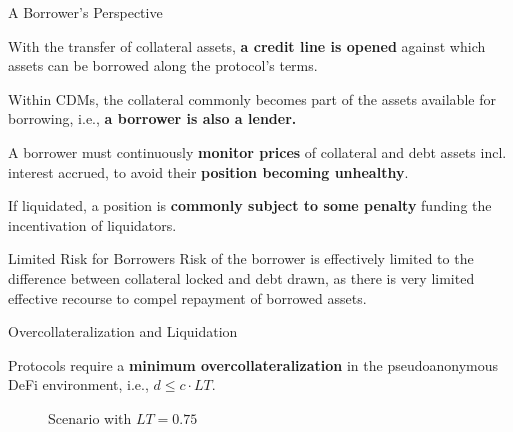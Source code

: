\documentclass[]{beamer}
\begin{document}
\begin{frame}{A Borrower's Perspective}

With the transfer of collateral assets, \textbf{a credit line is opened }against which assets can be borrowed along the protocol’s terms.

\vspace{0.8 em}
Within CDMs, the collateral commonly becomes part of the assets available for borrowing, i.e., \textbf{a borrower is also a lender.}

 {
\vspace{0.8 em}
A borrower must continuously \textbf{monitor prices} of collateral and debt assets incl. interest accrued, to avoid their \textbf{position becoming unhealthy}.

\vspace{0.8 em}
If liquidated, a position is \textbf{commonly subject to some penalty} funding the incentivation of liquidators.
}

 {
\vspace{0.8 em}
\begin{keytakeaway}{Limited Risk for Borrowers}
	Risk of the borrower is effectively limited to the difference between collateral locked and debt drawn, as there is very limited effective recourse to compel repayment of borrowed assets. 
\end{keytakeaway}
}
	
\end{frame}


\begin{frame}{Overcollateralization and Liquidation}

Protocols require a \textbf{minimum overcollateralization} in the pseudoanonymous DeFi environment, i.e., $d \leq c \cdot LT$.
\vspace{1em}

\begin{minipage}{0.6\textwidth}
	\vspace{1.5em}
	\begin{figure}[t]
		\centering
		\begin{tikzpicture}[scale=0.5, every node/.style={scale=0.8}]
			
		\end{tikzpicture}
		\caption{Scenario with $LT = 0.75$}
	\end{figure}
\end{minipage}
\begin{minipage}{0.38\textwidth}
	
	
	\vspace{1em}
\end{minipage}
	
\end{frame}
\end{document}
